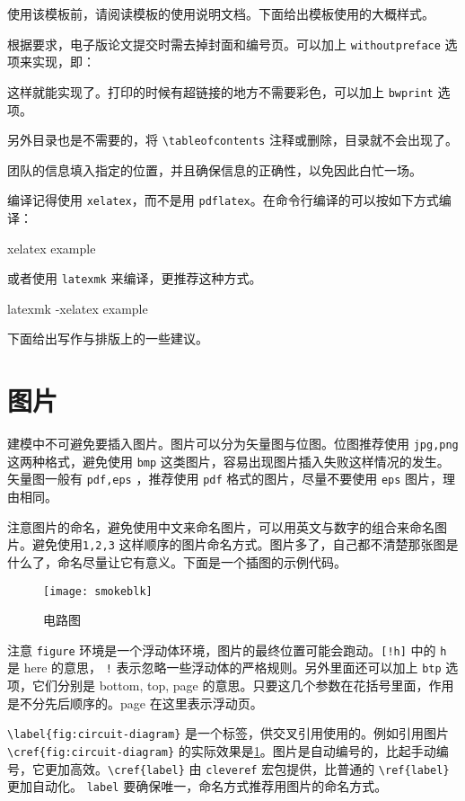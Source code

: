 \documentclass[withoutpreface,bwprint]{cumcmthesis}
\begin{document}
使用该模板前，请阅读模板的使用说明文档。下面给出模板使用的大概样式。

根据要求，电子版论文提交时需去掉封面和编号页。可以加上 \verb|withoutpreface|  选项来实现，即：
这样就能实现了。打印的时候有超链接的地方不需要彩色，可以加上 \verb|bwprint| 选项。

另外目录也是不需要的，将 \verb|\tableofcontents| 注释或删除，目录就不会出现了。

团队的信息填入指定的位置，并且确保信息的正确性，以免因此白忙一场。

编译记得使用 \verb|xelatex|，而不是用 \verb|pdflatex|。在命令行编译的可以按如下方式编译：
\begin{tcode}
	xelatex example
\end{tcode}
或者使用 \verb|latexmk| 来编译，更推荐这种方式。
\begin{tcode}
	latexmk -xelatex example
\end{tcode}

下面给出写作与排版上的一些建议。

\section{图片}

建模中不可避免要插入图片。图片可以分为矢量图与位图。位图推荐使用 \verb|jpg,png| 这两种格式，避免使用 \verb|bmp| 这类图片，容易出现图片插入失败这样情况的发生。矢量图一般有 \verb|pdf,eps| ，推荐使用 \verb|pdf|  格式的图片，尽量不要使用 \verb|eps| 图片，理由相同。

注意图片的命名，避免使用中文来命名图片，可以用英文与数字的组合来命名图片。避免使用\verb|1,2,3| 这样顺序的图片命名方式。图片多了，自己都不清楚那张图是什么了，命名尽量让它有意义。下面是一个插图的示例代码。
\begin{figure}[!h]
    \centering
    \texttt{[image: smokeblk]}
    \caption{电路图}
    \label{fig:circuit-diagram}
\end{figure}

注意 \verb|figure| 环境是一个浮动体环境，图片的最终位置可能会跑动。\verb|[!h]| 中的 \verb|h| 是 here 的意思， \verb|!| 表示忽略一些浮动体的严格规则。另外里面还可以加上 \verb|btp| 选项，它们分别是 bottom, top, page 的意思。只要这几个参数在花括号里面，作用是不分先后顺序的。page 在这里表示浮动页。

\verb|\label{fig:circuit-diagram}| 是一个标签，供交叉引用使用的。例如引用图片 \verb|\cref{fig:circuit-diagram}| 的实际效果是\cref{fig:circuit-diagram}。图片是自动编号的，比起手动编号，它更加高效。\verb|\cref{label}| 由 \verb|cleveref| 宏包提供，比普通的 \verb|\ref{label}| 更加自动化。 \verb|label| 要确保唯一，命名方式推荐用图片的命名方式。
\end{document}
